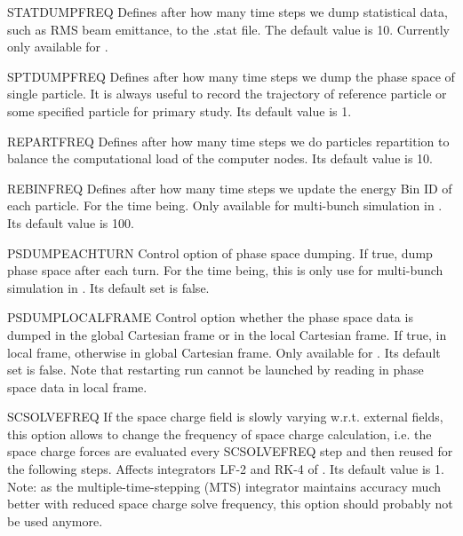 \begin{kdescription}
  \item[STATDUMPFREQ]
  Defines after how many time steps we dump statistical data, such as RMS beam emittance, to the .stat file.
  The default value is 10. Currently only available for \opalt.

  \item[SPTDUMPFREQ]
  Defines after how many time steps we dump the phase space of single particle.
  It is always useful to record the trajectory of reference particle
  or some specified particle for primary study. Its default value is 1.

  \item[REPARTFREQ]
  Defines after how many time steps we do particles repartition to balance the computational load of
  the computer nodes. Its default value is 10.

  \item[REBINFREQ]
  Defines after how many time steps we update the energy Bin ID of each particle. For the time being.
  Only available for multi-bunch simulation in \opalcycl. Its default value is 100.

  \item[PSDUMPEACHTURN]
  Control option of phase space dumping. If true, dump phase space after each turn.
  For the time being, this is only use for multi-bunch simulation in \opalcycl. Its default set is false.

  \item[PSDUMPLOCALFRAME]
  Control option whether the phase space data is dumped in the global Cartesian frame or in the local Cartesian frame.
  If true, in local frame, otherwise in global Cartesian frame. Only available for \opalcycl. Its default set is false.
  Note that restarting run cannot be launched by reading in phase space data in local frame.

  \item[SCSOLVEFREQ]
  If the space charge field is slowly varying w.r.t. external fields,  this option allows to change the frequency of space charge calculation,
  i.e. the space charge forces are evaluated every SCSOLVEFREQ step and then reused for the following steps. Affects integrators LF-2 and RK-4 of \opalcycl. Its default value is 1. Note: as the multiple-time-stepping (MTS) integrator maintains accuracy much better with reduced space charge solve frequency, this option should probably not be used anymore.


\end{kdescription}
